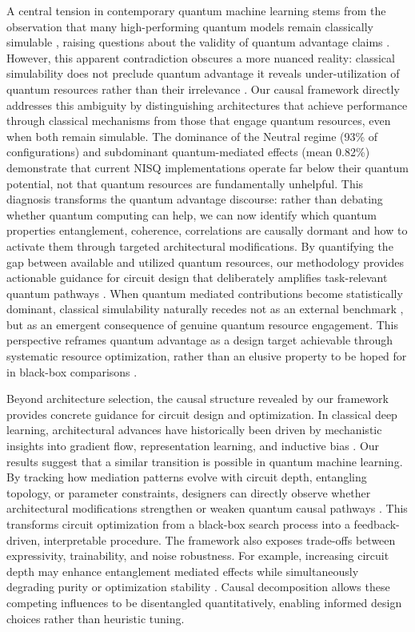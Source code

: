 \documentclass[
    reprint,
    amsmath, amssymb,
    aps,
    floatfix,
    nofootinbib
]{revtex4-1}
\begin{document}
A central tension in contemporary quantum machine learning stems from the observation that many high-performing quantum models remain classically simulable \cite{bermejo2024quantum,bowles2024better}, raising questions about the validity of quantum advantage claims \cite{cerezo2022challenges,schuld2022quantum}. However, this apparent contradiction obscures a more nuanced reality: classical simulability does not preclude quantum advantage \cite{mcclean2018barren} it reveals under-utilization of quantum resources rather than their irrelevance \cite{huang2022quantum}. Our causal framework directly addresses this ambiguity by distinguishing architectures that achieve performance through classical mechanisms from those that engage quantum resources, even when both remain simulable. The dominance of the Neutral regime (93\% of configurations) and subdominant quantum-mediated effects (mean 0.82\%) demonstrate that current NISQ implementations \cite{wang2021noise} operate far below their quantum potential, not that quantum resources are fundamentally unhelpful. This diagnosis transforms the quantum advantage discourse: rather than debating whether quantum computing can help, we can now identify which quantum properties entanglement, coherence, correlations are causally dormant and how to activate them through targeted architectural modifications. By quantifying the gap between available and utilized quantum resources, our methodology provides actionable guidance for circuit design that deliberately amplifies task-relevant quantum pathways \cite{cerezo2022challenges,schuld2022quantum,larocca2023theory}. When quantum mediated contributions become statistically dominant, classical simulability naturally recedes not as an external benchmark \cite{cerezo2025does}, but as an emergent consequence of genuine quantum resource engagement. This perspective reframes quantum advantage as a design target achievable through systematic resource optimization, rather than an elusive property to be hoped for in black-box comparisons \cite{thanasilp2024exponential}.


Beyond architecture selection, the causal structure revealed by our framework provides concrete guidance for circuit design and optimization. In classical deep learning, architectural advances have historically been driven by mechanistic insights into gradient flow, representation learning, and inductive bias \cite{meyer2023exploiting}. Our results suggest that a similar transition is possible in quantum machine learning. By tracking how mediation patterns evolve with circuit depth, entangling topology, or parameter constraints, designers can directly observe whether architectural modifications strengthen or weaken quantum causal pathways \cite{du2022quantum}. This transforms circuit optimization from a black-box search process into a feedback-driven, interpretable procedure. The framework also exposes trade-offs between expressivity, trainability, and noise robustness. For example, increasing circuit depth may enhance entanglement mediated effects while simultaneously degrading purity or optimization stability \cite{ragone2024lie}. Causal decomposition allows these competing influences to be disentangled quantitatively, enabling informed design choices rather than heuristic tuning.
\end{document}

